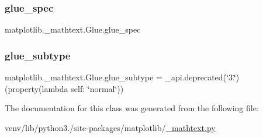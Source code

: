 \subsubsection{\texorpdfstring{glue\+\_\+spec}{glue\_spec}}
{\footnotesize\ttfamily matplotlib.\+\_\+mathtext.\+Glue.\+glue\+\_\+spec}

\mbox{\label{classmatplotlib_1_1__mathtext_1_1Glue_a13e58f4238573cd2fc6b674b62181243}} 
\subsubsection{\texorpdfstring{glue\+\_\+subtype}{glue\_subtype}}
{\footnotesize\ttfamily matplotlib.\+\_\+mathtext.\+Glue.\+glue\+\_\+subtype = \+\_\+api.\+deprecated(\char`\"{}3.\char`\"{})(property(lambda self\+: \char`\"{}normal\char`\"{}))\hspace{0.3cm}{\ttfamily [static]}}



The documentation for this class was generated from the following file\+:\begin{DoxyCompactItemize}
\item 
venv/lib/python3./site-\/packages/matplotlib/\hyperlink{__mathtext_8py}{\+\_\+mathtext.\+py}\end{DoxyCompactItemize}

